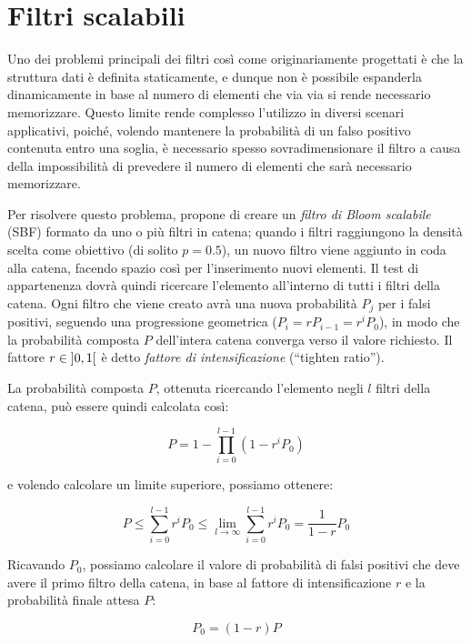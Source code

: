 \section{Filtri scalabili}
\label{sec:bloomscalable}

Uno dei problemi principali dei filtri così come originariamente progettati è che la struttura
dati è definita staticamente, e dunque non è possibile espanderla dinamicamente in base al
numero di elementi che via via si rende necessario memorizzare. Questo limite rende complesso
l'utilizzo in diversi scenari applicativi, poiché, volendo mantenere la probabilità di un falso
positivo contenuta entro una soglia, è necessario spesso sovradimensionare il filtro a causa della 
impossibilità di prevedere il numero di elementi che sarà necessario memorizzare.

Per risolvere questo problema, \cite{bloom-scalable} propone di creare un \emph{filtro di Bloom
scalabile} (SBF) formato da uno o più filtri in catena; quando i filtri raggiungono la densità
scelta come obiettivo (di solito $p=0.5$), un nuovo filtro viene aggiunto in coda alla catena,
facendo spazio così per l'inserimento nuovi elementi. Il test di appartenenza dovrà quindi ricercare
l'elemento all'interno di tutti i filtri della catena. Ogni filtro che viene creato avrà una nuova
probabilità $P_j$ per i falsi positivi, seguendo una progressione geometrica ($P_i = rP_{i-1} =
r^iP_0$), in modo che la probabilità composta $P$ dell'intera catena converga verso il valore
richiesto. Il fattore $r \in \interval[open]{0}{1}$ è detto \emph{fattore di intensificazione}
(``tighten ratio'').

La probabilità composta $P$, ottenuta ricercando l'elemento negli $l$ filtri della catena, può
essere quindi calcolata così:

$$ P = 1 - \prod_{i=0}^{l-1}(1-r^iP_0) $$

e volendo calcolare un limite superiore, possiamo ottenere:

$$ P \leq \sum_{i=0}^{l-1} r^iP_0 \leq \lim_{l \rightarrow \infty} \sum_{i=0}^{l-1} r^iP_0 =
\frac{1}{1-r}P_0 $$

Ricavando $P_0$, possiamo calcolare il valore di probabilità di falsi positivi che deve avere
il primo filtro della catena, in base al fattore di intensificazione $r$ e la probabilità finale
attesa $P$:

\begin{equation} \label{eq:p0fromp}
P_0 = (1-r)P
\end{equation}

